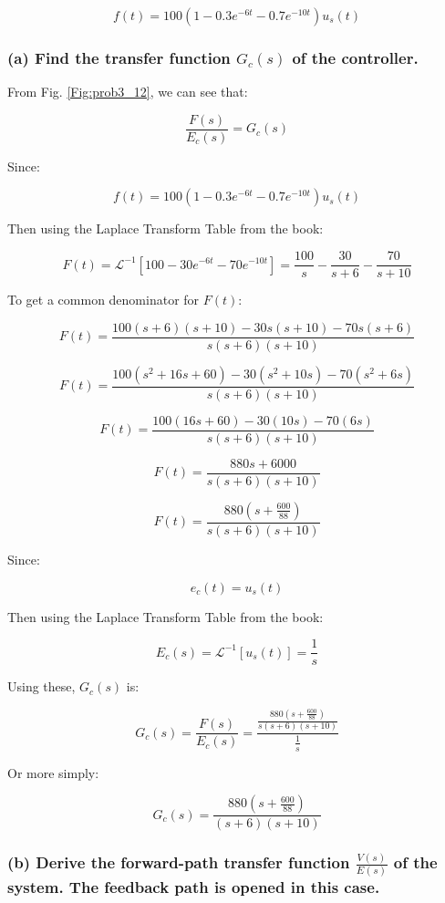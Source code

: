\documentclass[12pt, letterpaper]{../assignment}
\begin{document}
$$ f(t) = 100(1 - 0.3 e^{-6t} - 0.7 e ^{-10t}) u_s (t) $$

\subsubsection*{(a) Find the transfer function $G_c(s)$ of the controller.}

From Fig. \ref{Fig:prob3_12}, we can see that:

$$ \frac{F(s)}{E_c(s)} = G_c(s) $$

Since:

$$ f(t) = 100(1 - 0.3 e^{-6t} - 0.7 e ^{-10t}) u_s (t) $$

Then using the Laplace Transform Table from the book:

$$ F(t) = \mathcal{L}^{-1} \left[100 - 30 e^{-6t} - 70 e ^{-10t}\right]  =
\frac{100}{s} - \frac{30}{s+6} - \frac{70}{s+10} $$

To get a common denominator for $F(t)$:

$$ F(t) =
\frac{100(s+6)(s+10) - 30s(s+10)  - 70s(s+6)}{s(s+6)(s+10)} $$

$$ F(t) =
\frac{100(s^2+16s+60) - 30(s^2+10s)  - 70(s^2+6s)}{s(s+6)(s+10)} $$

$$ F(t) =
\frac{100(16s+60) - 30(10s)  - 70(6s)}{s(s+6)(s+10)} $$

$$ F(t) =
\frac{880s + 6000}{s(s+6)(s+10)} $$

$$ F(t) =
\frac{880\left(s + \frac{600}{88}\right)}{s(s+6)(s+10)} $$

Since:

$$ e_c(t) = u_s (t) $$

Then using the Laplace Transform Table from the book:

$$ E_c(s) = \mathcal{L}^{-1} \left[u_s (t)\right]  =
\frac{1}{s} $$

Using these, $G_c(s)$ is:

$$ G_c(s) = \frac{F(s)}{E_c(s)} =
\frac{\frac{880\left(s + \frac{600}{88}\right)}{s(s+6)(s+10)}}{\frac{1}{s}} $$

Or more simply:

\begin{answer}
    $$ G_c(s) = 
    \frac{880\left(s + \frac{600}{88}\right)}{(s+6)(s+10)} $$
\end{answer}

\subsubsection*{(b) Derive the forward-path transfer function $\frac{V(s)}{E(s)}$ of the system.
The feedback path is opened in this case.}
\end{document}
